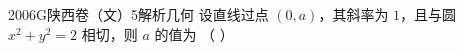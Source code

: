 
\begin{problem}{2006}{G}{陕西卷（文）}{5}{解析几何}
设直线过点 $ (0,a) $，其斜率为 $ 1 $，且与圆 $ x^2 + y^2 = 2 $ 相切，则 $ a $ 的值为 （ ）
\begin{choices}
\end{choices}
\end{problem}

\begin{answer}

\end{answer}

\begin{solutions}

\end{solutions}